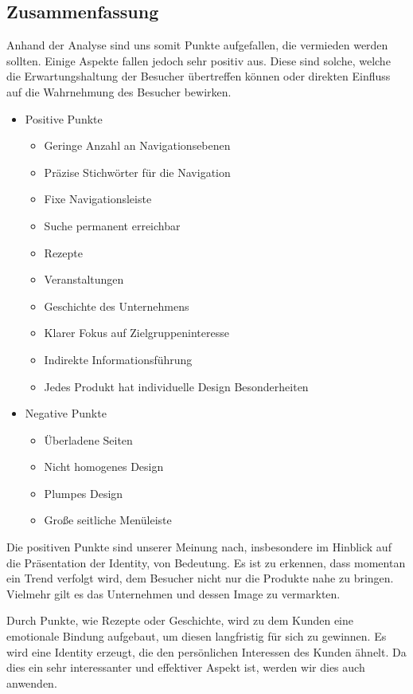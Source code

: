 \documentclass[12pt,a4paper,oneside,ngerman]{article}
\begin{document}
\subsection{Zusammenfassung}
Anhand der Analyse sind uns somit Punkte aufgefallen, die vermieden werden sollten. Einige Aspekte fallen jedoch sehr positiv aus. Diese sind solche, welche die Erwartungshaltung der Besucher übertreffen können oder direkten Einfluss auf die Wahrnehmung des Besucher bewirken.


\begin{itemize}
\item{Positive Punkte}	
\begin{itemize} %
	\item{Geringe Anzahl an Navigationsebenen}
	\item{Präzise Stichwörter für die Navigation}
	\item{Fixe Navigationsleiste}
	\item{Suche permanent erreichbar}
	\item{Rezepte}
	\item{Veranstaltungen}
	\item{Geschichte des Unternehmens}
	\item{Klarer Fokus auf Zielgruppeninteresse}
	\item{Indirekte Informationsführung}
	\item{Jedes Produkt hat individuelle Design Besonderheiten}
\end{itemize}
\end{itemize}


\begin{itemize}
\item{Negative Punkte}	
\begin{itemize} %
	\item{Überladene Seiten}
	\item{Nicht homogenes Design}
	\item{Plumpes Design}
	\item{Große seitliche Menüleiste}
\end{itemize}
\end{itemize}

Die positiven Punkte sind unserer Meinung nach, insbesondere im Hinblick auf die Präsentation der Identity, von Bedeutung. Es ist zu erkennen, dass momentan ein Trend verfolgt wird, dem Besucher nicht nur die Produkte nahe zu bringen. Vielmehr gilt es das Unternehmen und dessen Image zu vermarkten. 

Durch Punkte, wie Rezepte oder Geschichte, wird zu dem Kunden eine emotionale Bindung aufgebaut, um diesen langfristig für sich zu gewinnen. 
Es wird eine Identity erzeugt, die den persönlichen Interessen des Kunden ähnelt.
Da dies ein sehr interessanter und effektiver Aspekt ist, werden wir dies auch anwenden.
\end{document}
